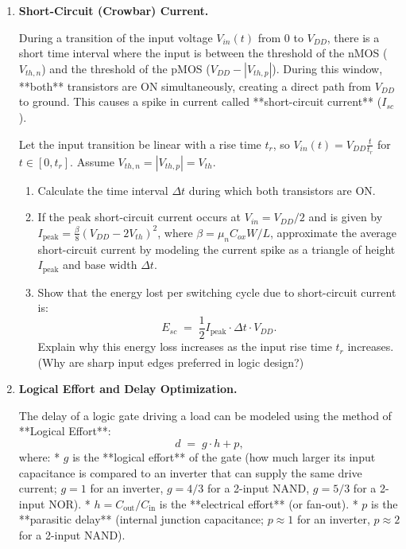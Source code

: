 \documentclass[12pt, a4paper]{book}
\begin{document}
\begin{deepbox}
\begin{enumerate}[label=\textbf{D\arabic*.}]
  \item \textbf{Short-Circuit (Crowbar) Current.}
  
        During a transition of the input voltage $V_{in}(t)$ from 0 to $V_{DD}$, there is a short time interval where the input is between the threshold of the nMOS ($V_{th,n}$) and the threshold of the pMOS ($V_{DD} - |V_{th,p}|$).
        During this window, **both** transistors are ON simultaneously, creating a direct path from $V_{DD}$ to ground. This causes a spike in current called **short-circuit current** ($I_{sc}$).
        
        Let the input transition be linear with a rise time $t_r$, so $V_{in}(t) = V_{DD} \frac{t}{t_r}$ for $t \in [0, t_r]$.
        Assume $V_{th,n} = |V_{th,p}| = V_{th}$.
        \begin{enumerate}[label=(\alph*)]
          \item Calculate the time interval $\Delta t$ during which both transistors are ON.
          \item If the peak short-circuit current occurs at $V_{in} = V_{DD}/2$ and is given by $I_{\text{peak}} = \frac{\beta}{8} (V_{DD} - 2V_{th})^2$, where $\beta = \mu_n C_{ox} W/L$, approximate the average short-circuit current by modeling the current spike as a triangle of height $I_{\text{peak}}$ and base width $\Delta t$.
          \item Show that the energy lost per switching cycle due to short-circuit current is:
                \[
                  E_{sc} \;=\; \frac{1}{2} I_{\text{peak}} \cdot \Delta t \cdot V_{DD}.
                \]
                Explain why this energy loss increases as the input rise time $t_r$ increases. (Why are sharp input edges preferred in logic design?)
        \end{enumerate}

  \item \textbf{Logical Effort and Delay Optimization.}
  
        The delay of a logic gate driving a load can be modeled using the method of **Logical Effort**:
        \[
          d \;=\; g \cdot h + p,
        \]
        where:
        * $g$ is the **logical effort** of the gate (how much larger its input capacitance is compared to an inverter that can supply the same drive current; $g = 1$ for an inverter, $g = 4/3$ for a 2-input NAND, $g = 5/3$ for a 2-input NOR).
        * $h = C_{\text{out}}/C_{\text{in}}$ is the **electrical effort** (or fan-out).
        * $p$ is the **parasitic delay** (internal junction capacitance; $p \approx 1$ for an inverter, $p \approx 2$ for a 2-input NAND).
        

\end{enumerate}
\end{deepbox}
\end{document}

